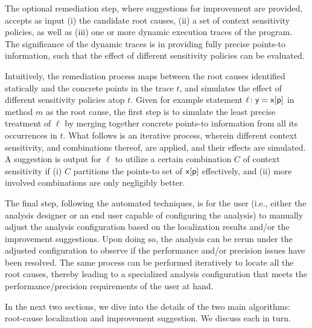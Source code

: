 The optional remediation step, where suggestions for improvement are provided, accepts as input (i) the candidate root causes, (ii) a set of context sensitivity policies, as well as (iii) one or more dynamic execution traces of the program. The significance of the dynamic traces is in providing fully precise points-to information, such that the effect of different sensitivity policies can be evaluated.

Intuitively, the remediation process maps between the root causes identified statically and the concrete points in the trace $t$, and simulates the effect of different sensitivity policies atop $t$. Given for example statement $\ell\colon {\sf y=x[p]}$ in method $m$ as the root cause, the first step is to simulate the least precise treatment of $\ell$ by merging together concrete points-to information from all its occurrences in $t$. What follows is an iterative process, wherein different context sensitivity, and combinations thereof, are applied, and their effects are simulated. A suggestion is output for $\ell$ to utilize a certain combination $C$ of context sensitivity if (i) $C$ partitions the points-to set of ${\sf x[p]}$ effectively, and (ii) more involved combinations are only negligibly better.

The final step, following the automated techniques, is for the user (i.e., either the analysis designer or an end user capable of configuring the analysis) to manually adjust the analysis configuration based on the localization results and/or the improvement suggestions. Upon doing so, the analysis can be rerun under the adjusted configuration to observe if the performance and/or precision issues have been resolved. The same process can be performed iteratively to locate all the root causes, thereby leading to a specialized analysis configuration that meets the performance/precision requirements of the user at hand.

In the next two sections, we dive into the details of the two main algorithms: root-cause localization and improvement suggestion. We discuss each in turn.

